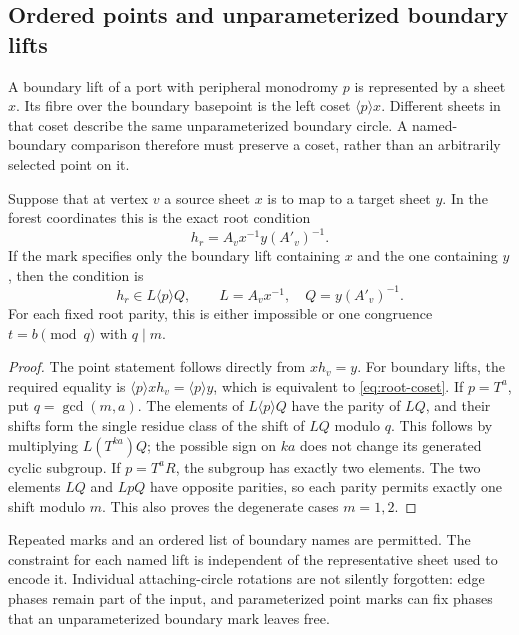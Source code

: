 \subsection{Ordered points and unparameterized boundary lifts}

A boundary lift of a port with peripheral monodromy $p$ is represented
by a sheet $x$.  Its fibre over the boundary basepoint is the left coset
$\langle p\rangle x$.  Different sheets in that coset describe the same
unparameterized boundary circle.  A named-boundary comparison therefore
must preserve a coset, rather than an arbitrarily selected point on it.

\begin{lemma}
Suppose that at vertex $v$ a source sheet $x$ is to map to a target sheet
$y$.  In the forest coordinates this is the exact root condition
\[
 h_r=A_vx^{-1}y(A'_v)^{-1}.
\]
If the mark specifies only the boundary lift containing $x$ and the one
containing $y$, then the condition is
\begin{equation}\label{eq:root-coset}
 h_r\in L\langle p\rangle Q,\qquad
 L=A_vx^{-1},\quad Q=y(A'_v)^{-1}.
\end{equation}
For each fixed root parity, this is either impossible or one congruence
$t=b\pmod q$ with $q\mid m$.
\end{lemma}
\begin{proof}
The point statement follows directly from $xh_v=y$.  For boundary lifts,
the required equality is
$\langle p\rangle xh_v=\langle p\rangle y$, which is equivalent to
\eqref{eq:root-coset}.
If $p=T^a$, put $q=\gcd(m,a)$.  The elements of
$L\langle p\rangle Q$ have the parity of $LQ$, and their shifts form the
single residue class of the shift of $LQ$ modulo $q$.  This follows by
multiplying $L(T^{ka})Q$; the possible sign on $ka$ does not change its
generated cyclic subgroup.
If $p=T^aR$, the subgroup has exactly two elements.  The two elements
$LQ$ and $LpQ$ have opposite parities, so each parity permits exactly
one shift modulo $m$.  This also proves the degenerate cases $m=1,2$.
\end{proof}

Repeated marks and an ordered list of boundary names are permitted.
The constraint for each named lift is independent of the representative
sheet used to encode it.  Individual attaching-circle rotations are
not silently forgotten: edge phases remain part of the input, and
parameterized point marks can fix phases that an unparameterized
boundary mark leaves free.


